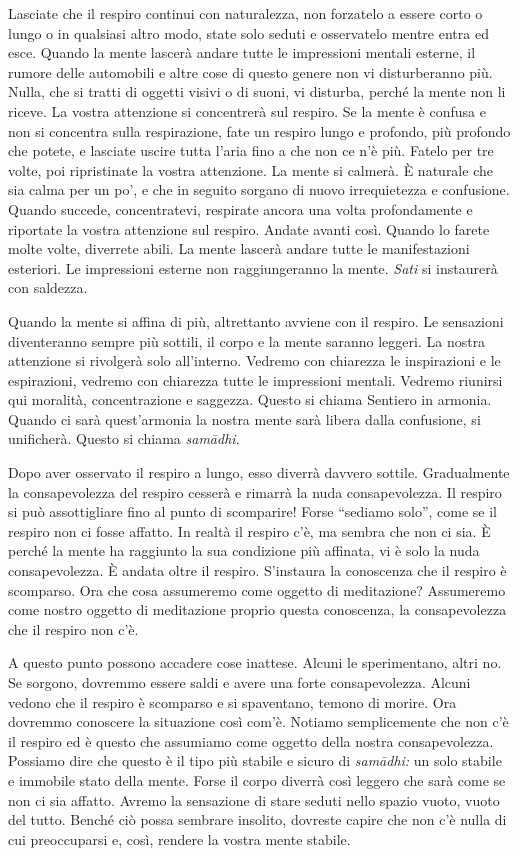 Lasciate che il respiro continui con naturalezza, non forzatelo a essere
corto o lungo o in qualsiasi altro modo, state solo seduti e osservatelo
mentre entra ed esce. Quando la mente lascerà andare tutte le
impressioni mentali esterne, il rumore delle automobili e altre cose di
questo genere non vi disturberanno più. Nulla, che si tratti di oggetti
visivi o di suoni, vi disturba, perché la mente non li riceve. La vostra
attenzione si concentrerà sul respiro. Se la mente è confusa e non si
concentra sulla respirazione, fate un respiro lungo e profondo, più
profondo che potete, e lasciate uscire tutta l'aria fino a che non ce
n'è più. Fatelo per tre volte, poi ripristinate la vostra attenzione. La
mente si calmerà. È naturale che sia calma per un po', e che in seguito
sorgano di nuovo irrequietezza e confusione. Quando succede,
concentratevi, respirate ancora una volta profondamente e riportate la
vostra attenzione sul respiro. Andate avanti così. Quando lo farete
molte volte, diverrete abili. La mente lascerà andare tutte le
manifestazioni esteriori. Le impressioni esterne non raggiungeranno la
mente. \emph{Sati} si instaurerà con saldezza.

Quando la mente si affina di più, altrettanto avviene con il respiro. Le
sensazioni diventeranno sempre più sottili, il corpo e la mente saranno
leggeri. La nostra attenzione si rivolgerà solo all'interno. Vedremo con
chiarezza le inspirazioni e le espirazioni, vedremo con chiarezza tutte
le impressioni mentali. Vedremo riunirsi qui moralità, concentrazione e
saggezza. Questo si chiama Sentiero in armonia. Quando ci sarà
quest'armonia la nostra mente sarà libera dalla confusione, si
unificherà. Questo si chiama \emph{samādhi}.

Dopo aver osservato il respiro a lungo, esso diverrà davvero sottile.
Gradualmente la consapevolezza del respiro cesserà e rimarrà la nuda
consapevolezza. Il respiro si può assottigliare fino al punto di
scomparire! Forse ``sediamo solo'', come se il respiro non ci fosse
affatto. In realtà il respiro c'è, ma sembra che non ci sia. È perché la
mente ha raggiunto la sua condizione più affinata, vi è solo la nuda
consapevolezza. È andata oltre il respiro. S'instaura la conoscenza che
il respiro è scomparso. Ora che cosa assumeremo come oggetto di
meditazione? Assumeremo come nostro oggetto di meditazione proprio
questa conoscenza, la consapevolezza che il respiro non c'è.

A questo punto possono accadere cose inattese. Alcuni le sperimentano,
altri no. Se sorgono, dovremmo essere saldi e avere una forte
consapevolezza. Alcuni vedono che il respiro è scomparso e si
spaventano, temono di morire. Ora dovremmo conoscere la situazione così
com'è. Notiamo semplicemente che non c'è il respiro ed è questo che
assumiamo come oggetto della nostra consapevolezza. Possiamo dire che
questo è il tipo più stabile e sicuro di \emph{samādhi:} un solo stabile
e immobile stato della mente. Forse il corpo diverrà così leggero che
sarà come se non ci sia affatto. Avremo la sensazione di stare seduti
nello spazio vuoto, vuoto del tutto. Benché ciò possa sembrare insolito,
dovreste capire che non c'è nulla di cui preoccuparsi e, così, rendere
la vostra mente stabile.

